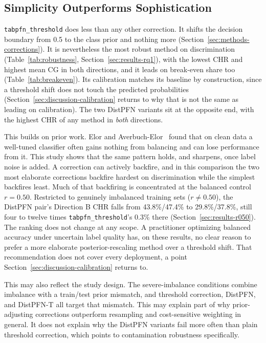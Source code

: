 \subsection{Simplicity Outperforms Sophistication}
\label{sec:discussion-simplicity}

\texttt{tabpfn\_threshold} does less than any other correction. It shifts the
decision boundary from 0.5 to the class prior and nothing more
(Section~\ref{sec:methods-corrections}). It is nevertheless the most robust method
on discrimination (Table~\ref{tab:robustness}, Section~\ref{sec:results-rq1}),
with the lowest CHR and highest mean CG in both directions, and it leads on
break-even share too (Table~\ref{tab:breakeven}). Its calibration matches its
baseline by construction, since a threshold shift does not touch the predicted
probabilities (Section~\ref{sec:discussion-calibration} returns to why that is
not the same as leading on calibration). The two DistPFN variants sit at the
opposite end, with the highest CHR of any method in \emph{both} directions.

This builds on prior work. Elor and Averbuch-Elor~\cite{elor2022smote} found that
on clean data a well-tuned classifier often gains nothing from balancing and can
lose performance from it. This study shows that the same pattern holds, and
sharpens, once label noise is added. A correction can actively backfire, and in
this comparison the two most elaborate corrections backfire hardest on
discrimination while the simplest backfires least. Much of that backfiring is
concentrated at the balanced control $r{=}0.50$. Restricted to genuinely
imbalanced training sets ($r{\neq}0.50$), the DistPFN pair's Direction B CHR falls
from 43.8\%/47.4\% to 29.8\%/37.8\%, still four to twelve times
\texttt{tabpfn\_threshold}'s 0.3\% there (Section~\ref{sec:results-r050}). The
ranking does not change at any scope. A practitioner optimizing balanced accuracy
under uncertain label quality has, on these results, no clear reason to prefer a
more elaborate posterior-rescaling method over a threshold shift. That
recommendation does not cover every deployment, a point
Section~\ref{sec:discussion-calibration} returns to.

This may also reflect the study design. The severe-imbalance conditions combine
imbalance with a train/test prior mismatch, and threshold correction, DistPFN,
and DistPFN-T all target that mismatch. This may explain part of why
prior-adjusting corrections outperform resampling and cost-sensitive weighting in
general. It does not explain why the DistPFN variants fail more often than plain
threshold correction, which points to contamination robustness specifically.

